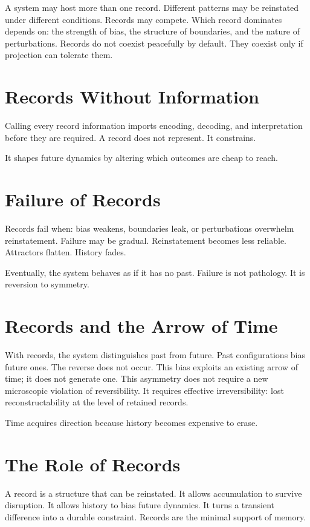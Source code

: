 \documentclass[11pt,twoside,openright]{book}
\begin{document}
A system may host more than one record. Different patterns may be reinstated under different conditions. Records may compete. Which record dominates depends on: the strength of bias, the structure of boundaries, and the nature of perturbations. Records do not coexist peacefully by default. They coexist only if projection can tolerate them.

\section*{Records Without Information}

Calling every record information imports encoding, decoding, and interpretation before they are required. A record does not represent. It constrains.

It shapes future dynamics by altering which outcomes are cheap to reach.

\section*{Failure of Records}

Records fail when: bias weakens, boundaries leak, or perturbations overwhelm reinstatement. Failure may be gradual. Reinstatement becomes less reliable. Attractors flatten. History fades.

Eventually, the system behaves as if it has no past. Failure is not pathology. It is reversion to symmetry.

\section*{Records and the Arrow of Time}

With records, the system distinguishes past from future. Past configurations bias future ones. The reverse does not occur. This bias exploits an existing arrow of time; it does not generate one. This asymmetry does not require a new microscopic violation of reversibility. It requires effective irreversibility: lost reconstructability at the level of retained records.

Time acquires direction because history becomes expensive to erase.

\section*{The Role of Records}

A record is a structure that can be reinstated. It allows accumulation to survive disruption. It allows history to bias future dynamics. It turns a transient difference into a durable constraint. Records are the minimal support of memory.
\end{document}
